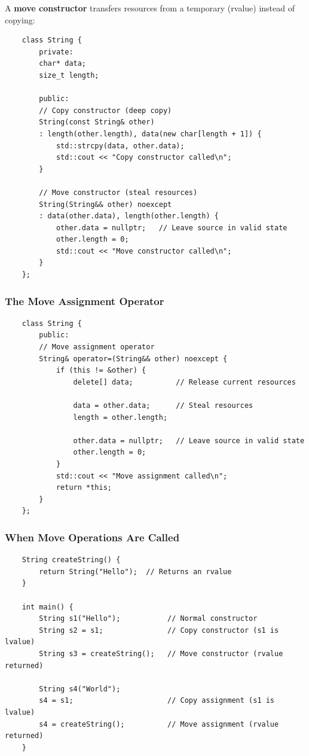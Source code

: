 A \textbf{move constructor} transfers resources from a temporary (rvalue) instead of copying:

\begin{lstlisting}
	class String {
		private:
		char* data;
		size_t length;
		
		public:
		// Copy constructor (deep copy)
		String(const String& other) 
		: length(other.length), data(new char[length + 1]) {
			std::strcpy(data, other.data);
			std::cout << "Copy constructor called\n";
		}
		
		// Move constructor (steal resources)
		String(String&& other) noexcept
		: data(other.data), length(other.length) {
			other.data = nullptr;   // Leave source in valid state
			other.length = 0;
			std::cout << "Move constructor called\n";
		}
	};
\end{lstlisting}

\subsubsection{The Move Assignment Operator}

\begin{lstlisting}
	class String {
		public:
		// Move assignment operator
		String& operator=(String&& other) noexcept {
			if (this != &other) {
				delete[] data;          // Release current resources
				
				data = other.data;      // Steal resources
				length = other.length;
				
				other.data = nullptr;   // Leave source in valid state
				other.length = 0;
			}
			std::cout << "Move assignment called\n";
			return *this;
		}
	};
\end{lstlisting}

\subsubsection{When Move Operations Are Called}

\begin{lstlisting}
	String createString() {
		return String("Hello");  // Returns an rvalue
	}
	
	int main() {
		String s1("Hello");           // Normal constructor
		String s2 = s1;               // Copy constructor (s1 is lvalue)
		String s3 = createString();   // Move constructor (rvalue returned)
		
		String s4("World");
		s4 = s1;                      // Copy assignment (s1 is lvalue)
		s4 = createString();          // Move assignment (rvalue returned)
	}
\end{lstlisting}

